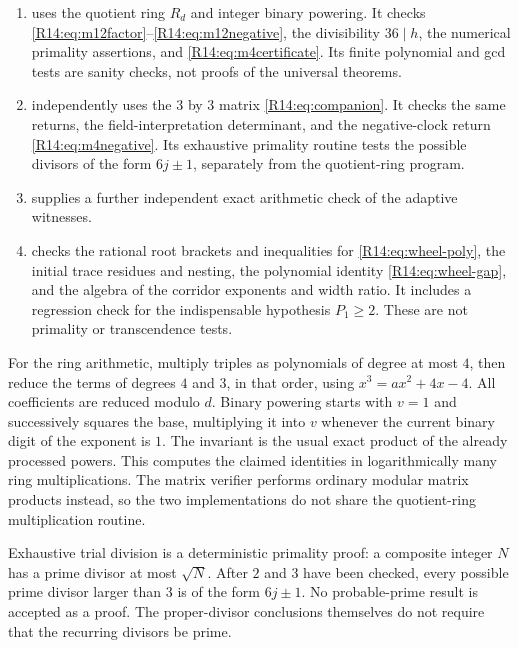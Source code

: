 \documentclass[11pt,a4paper]{article}
\theoremstyle{definition}\newtheorem{definition}[theorem]{Definition}
\theoremstyle{remark}\newtheorem{remark}[theorem]{Remark}
\begin{document}
\begin{enumerate}
 \item {} uses the
       quotient ring $R_d$ and integer binary powering. It checks
       \eqref{R14:eq:m12factor}--\eqref{R14:eq:m12negative}, the divisibility
       $36\mid h$, the numerical primality assertions, and
       \eqref{R14:eq:m4certificate}. Its finite polynomial and gcd
       tests are sanity checks, not proofs of the universal
       theorems.
 \item {} independently uses
       the $3$ by $3$ matrix \eqref{R14:eq:companion}. It checks the
       same returns, the field-interpretation determinant, and the
       negative-clock return \eqref{R14:eq:m4negative}. Its exhaustive
       primality routine tests the possible divisors of the form
       $6j\pm1$, separately from the quotient-ring program.
 \item {} supplies a further independent
       exact arithmetic check of the adaptive witnesses.
 \item {} checks the
       rational root brackets and inequalities for
       \eqref{R14:eq:wheel-poly}, the initial trace residues and
       nesting, the polynomial identity \eqref{R14:eq:wheel-gap},
       and the algebra of the corridor exponents and width ratio.
       It includes a regression check for the indispensable
       hypothesis $P_1\ge2$. These are not primality or
       transcendence tests.
\end{enumerate}

For the ring arithmetic, multiply triples as polynomials of degree
at most $4$, then reduce the terms of degrees $4$ and $3$, in that
order, using $x^3=ax^2+4x-4$. All coefficients are reduced modulo
$d$. Binary powering starts with $v=1$ and successively squares the
base, multiplying it into $v$ whenever the current binary digit of
the exponent is $1$. The invariant is the usual exact product of
the already processed powers. This computes the claimed identities
in logarithmically many ring multiplications. The matrix verifier
performs ordinary modular matrix products instead, so the two
implementations do not share the quotient-ring multiplication
routine.

Exhaustive trial division is a deterministic primality proof: a
composite integer $N$ has a prime divisor at most $\sqrt N$.
After $2$ and $3$ have been checked, every possible prime divisor
larger than $3$ is of the form $6j\pm1$. No probable-prime result
is accepted as a proof. The proper-divisor conclusions themselves
do not require that the recurring divisors be prime.
\end{document}
